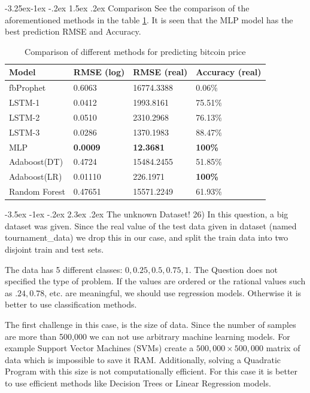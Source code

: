 \documentclass[11pt]{article}
\makeatletter
\renewcommand\section{\@startsection {section}{1}{\z@}%
                                       {-3.5ex \@plus -1ex \@minus -.2ex}%
                                       {2.3ex \@plus.2ex}%
                                       {\normalfont\fontfamily{phv}\fontsize{16}{19}\bfseries}}
\renewcommand\subsection{\@startsection{subsection}{2}{\z@}%
                                         {-3.25ex\@plus -1ex \@minus -.2ex}%
                                         {1.5ex \@plus .2ex}%
                                         {\normalfont\fontfamily{phv}\fontsize{14}{17}\bfseries}}
\makeatother
\begin{document}
\subsection{Comparison}
See the comparison of the aforementioned methods in the table \ref{tbl:5}. It is seen that the MLP model has the best prediction RMSE and Accuracy.
\begin{table}[]
\centering
\begin{tabular}{@{}llll@{}}
\textbf{Model} & \textbf{RMSE (log)} & \textbf{RMSE (real)} & \textbf{Accuracy (real)} \\ \midrule
fbProphet & 0.6063 & 16774.3388 & 0.06\% \\
LSTM-1 & 0.0412 & 1993.8161 & 75.51\% \\
LSTM-2 & 0.0510 & 2310.2968 & 76.13\% \\
LSTM-3 & 0.0286 & 1370.1983 & 88.47\% \\
MLP & \textbf{0.0009} & \textbf{12.3681} & \textbf{100\%} \\
Adaboost(DT) & 0.4724 & 15484.2455 & 51.85\% \\
Adaboost(LR) & 0.01110 & 226.1971 & \textbf{100\%} \\
Random Forest & 0.47651 & 15571.2249 & 61.93\% \\ \bottomrule
\end{tabular}
\caption{Comparison of different methods for predicting bitcoin price}
\label{tbl:5}
\end{table}

\section{The unknown Dataset!}
26) In this question, a big dataset was given. Since the real value of the test data given in dataset (named tournament\_data) we drop this in our case, and split the train data into two disjoint train and test sets.

The data has 5 different classes: $0, 0.25, 0.5, 0.75, 1$. The Question does not specified the type of problem. If the values are ordered or the rational values such as $.24, 0.78$, etc. are meaningful, we should use regression models. Otherwise it is better to use classification methods.

The first challenge in this case, is the size of data. Since the number of samples are more than 500,000 we can not use arbitrary machine learning models. For example Support Vector Machines (SVMs) create a $500,000\times 500,000$ matrix of data which is impossible to save it RAM. Additionally, solving a Quadratic Program with this size is not computationally efficient. For this case it is better to use efficient methods like Decision Trees or Linear Regression models.
\end{document}
